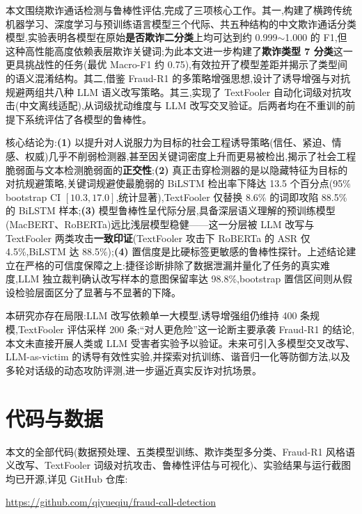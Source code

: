 \documentclass[11pt,a4paper]{article}
\begin{document}
本文围绕欺诈通话检测与鲁棒性评估,完成了三项核心工作。其一,构建了横跨传统机器学习、深度学习与预训练语言模型三个代际、共五种结构的中文欺诈通话分类模型,实验表明各模型在原始\textbf{是否欺诈二分类}上均可达到约 0.999$\sim$1.000 的 F1,但这种高性能高度依赖表层欺诈关键词;为此本文进一步构建了\textbf{欺诈类型 7 分类}这一更具挑战性的任务(最优 Macro-F1 约 0.75),有效拉开了模型差距并揭示了类型间的语义混淆结构。其二,借鉴 Fraud-R1 的多策略增强思想,设计了诱导增强与对抗规避两组共八种 LLM 语义改写策略。其三,实现了 TextFooler 自动化词级对抗攻击(中文离线适配),从词级扰动维度与 LLM 改写交叉验证。后两者均在不重训的前提下系统评估了各模型的鲁棒性。

核心结论为:\textbf{(1)} 以提升对人说服力为目标的社会工程诱导策略(信任、紧迫、情感、权威)几乎不削弱检测器,甚至因关键词密度上升而更易被检出,揭示了社会工程脆弱面与文本检测脆弱面的\textbf{正交性};\textbf{(2)} 真正击穿检测器的是以隐藏特征为目标的对抗规避策略,关键词规避使最脆弱的 BiLSTM 检出率下降达 13.5 个百分点(95\% bootstrap CI $[10.3,17.0]$,统计显著),TextFooler 仅替换 8.6\% 的词即攻陷 88.5\% 的 BiLSTM 样本;\textbf{(3)} 模型鲁棒性呈代际分层,具备深层语义理解的预训练模型(MacBERT、RoBERTa)远比浅层模型稳健——这一分层被 LLM 改写与 TextFooler 两类攻击\textbf{一致印证}(TextFooler 攻击下 RoBERTa 的 ASR 仅 4.5\%,BiLSTM 达 88.5\%);\textbf{(4)} 置信度是比硬标签更敏感的鲁棒性探针。上述结论建立在严格的可信度保障之上:捷径诊断排除了数据泄漏并量化了任务的真实难度,LLM 独立裁判确认改写样本的意图保留率达 98.8\%,bootstrap 置信区间则从假设检验层面区分了显著与不显著的下降。

本研究亦存在局限:LLM 改写依赖单一大模型,诱导增强组仍维持 400 条规模,TextFooler 评估采样 200 条;“对人更危险”这一论断主要承袭 Fraud-R1 的结论,本文未直接开展人类或 LLM 受害者实验予以验证。未来可引入多模型交叉改写、LLM-as-victim 的诱导有效性实验,并探索对抗训练、谐音归一化等防御方法,以及多轮对话级的动态攻防评测,进一步逼近真实反诈对抗场景。

\section*{代码与数据}

本文的全部代码(数据预处理、五类模型训练、欺诈类型多分类、Fraud-R1 风格语义改写、TextFooler 词级对抗攻击、鲁棒性评估与可视化)、实验结果与运行截图均已开源,详见 GitHub 仓库:

\begin{center}
\url{https://github.com/qiyueqiu/fraud-call-detection}
\end{center}



\end{document}
